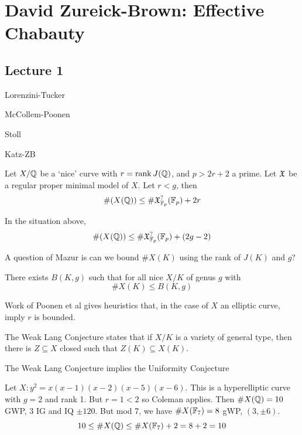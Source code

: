 \newpage
\section{David Zureick-Brown: Effective Chabauty}
\subsection{Lecture 1}

\noindent Lorenzini-Tucker \par
\noindent McCollem-Poonen \par
\noindent Stoll \par
\noindent Katz-ZB \par\vspace{2\baselineskip}


\begin{thm}[K-ZB]
Let $X/\mathbb{Q}$ be a `nice' curve with $r= \operatorname{rank} J(\mathbb{Q})$, and $p>2r+2$ a prime. Let $\mathfrak{X}$ be a regular proper minimal model of $X$. Let $r<g$, then 
	\[
	\#(X(\mathbb{Q})) \leq \# \mathfrak{X}_{\mathbb{F}_p}^?(\mathbb{F}_p) + 2r
	\]
\end{thm}


\begin{thm}
In the situation above, 
	\[
	\#(X(\mathbb{Q})) \leq \# \mathfrak{X}_{\mathbb{F}_p}^?(\mathbb{F}_p) + (2g-2)
	\]
\end{thm}


A question of Mazur is can we bound $\#X(K)$ using the rank of $J(K)$ and $g$?


\begin{conj}
There exists $B(K,g)$ such that for all nice $X/K$ of genus $g$ with
	\[
	\#X(K) \leq B(K,g)
	\]
\end{conj}


Work of Poonen et al gives heuristics that, in the case of $X$ an elliptic curve, imply $r$ is bounded. 


The Weak Lang Conjecture states that if $X/K$ is a variety of general type, then there is $Z \subseteq X$ closed such that $Z(K) \subseteq X(K)$. 


\begin{thm}
The Weak Lang Conjecture implies the Uniformity Conjecture
\end{thm}


\begin{ex}
Let $X: y^2= x(x-1)(x-2)(x-5)(x-6)$. This is a hyperelliptic curve with $g= 2$ and rank 1. But $r=1 < 2$ so Coleman applies. Then $\#X(\mathbb{Q})= 10$ GWP, 3 IG and IQ $\pm 120$. But mod 7, we have $\#X(\mathbb{F}_7)= 8$ gWP, $(3, \pm 6)$. 
	\[
	10 \leq \#X(\mathbb{Q}) \leq \#X(\mathbb{F}_7) + 2 = 8+2= 10
	\]
\end{ex}


